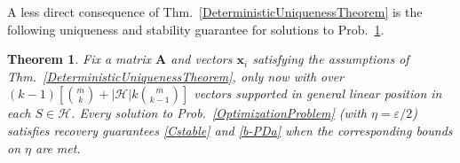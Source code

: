\documentclass[journal, twocolumn]{IEEEtran}
\newtheorem{theorem}{Theorem}
\begin{document}


A less direct consequence of Thm.~\ref{DeterministicUniquenessTheorem} is the following uniqueness and stability guarantee for solutions to Prob.~\ref{SLCopt}.

\begin{theorem}\label{SLCopt}
Fix a matrix $\mathbf{A}$ and vectors $\mathbf{x}_i$ satisfying the assumptions of Thm.~\ref{DeterministicUniquenessTheorem}, only now with over \mbox{$(k-1)\left[ {\overline m \choose k} + |\mathcal{H}|k{\overline m \choose k-1}\right]$} vectors supported in general linear position in each $S \in \mathcal{H}$. Every solution to Prob.~\ref{OptimizationProblem} (with $\eta = \varepsilon/2$) satisfies recovery guarantees \eqref{Cstable} and \eqref{b-PDa} when the corresponding bounds on $\eta$ are met.
\end{theorem}
\end{document}
